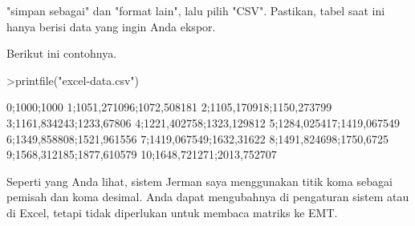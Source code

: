 \documentclass[a4paper,10pt]{article}
\begin{document}
\begin{eulernotebook}
\begin{eulercomment}
\begin{eulercomment}
\begin{eulercomment}
\begin{eulercomment}
\begin{eulercomment}
\begin{eulercomment}
\begin{eulercomment}
\begin{eulercomment}
\begin{eulercomment}
\begin{eulercomment}
\begin{eulercomment}
\begin{eulercomment}
\begin{eulercomment}
\begin{eulercomment}
\begin{eulercomment}
\begin{eulercomment}
\begin{eulercomment}
\begin{eulercomment}
\begin{eulercomment}
\begin{eulercomment}
\begin{eulercomment}
\begin{eulercomment}
\begin{eulercomment}
\begin{eulercomment}
\begin{eulercomment}
\begin{eulercomment}
\begin{eulercomment}
\begin{eulercomment}
\begin{eulercomment}
\begin{eulercomment}
\begin{eulercomment}
\begin{eulercomment}
\begin{eulercomment}
\begin{eulercomment}
\begin{eulercomment}
\begin{eulercomment}
\begin{eulercomment}
"simpan sebagai" dan "format lain", lalu pilih "CSV". Pastikan, tabel
saat ini hanya berisi data yang ingin Anda ekspor.

Berikut ini contohnya.
\end{eulercomment}
\begin{eulerprompt}
>printfile("excel-data.csv")
\end{eulerprompt}
\begin{euleroutput}
  0;1000;1000
  1;1051,271096;1072,508181
  2;1105,170918;1150,273799
  3;1161,834243;1233,67806
  4;1221,402758;1323,129812
  5;1284,025417;1419,067549
  6;1349,858808;1521,961556
  7;1419,067549;1632,31622
  8;1491,824698;1750,6725
  9;1568,312185;1877,610579
  10;1648,721271;2013,752707
\end{euleroutput}
\begin{eulercomment}
Seperti yang Anda lihat, sistem Jerman saya menggunakan titik koma
sebagai pemisah dan koma desimal. Anda dapat mengubahnya di pengaturan
sistem atau di Excel, tetapi tidak diperlukan untuk membaca matriks ke
EMT.


\end{eulercomment}
\end{eulercomment}
\end{eulercomment}
\end{eulercomment}
\end{eulercomment}
\end{eulercomment}
\end{eulercomment}
\end{eulercomment}
\end{eulercomment}
\end{eulercomment}
\end{eulercomment}
\end{eulercomment}
\end{eulercomment}
\end{eulercomment}
\end{eulercomment}
\end{eulercomment}
\end{eulercomment}
\end{eulercomment}
\end{eulercomment}
\end{eulercomment}
\end{eulercomment}
\end{eulercomment}
\end{eulercomment}
\end{eulercomment}
\end{eulercomment}
\end{eulercomment}
\end{eulercomment}
\end{eulercomment}
\end{eulercomment}
\end{eulercomment}
\end{eulercomment}
\end{eulercomment}
\end{eulercomment}
\end{eulercomment}
\end{eulercomment}
\end{eulercomment}
\end{eulercomment}
\end{eulernotebook}
\end{document}
